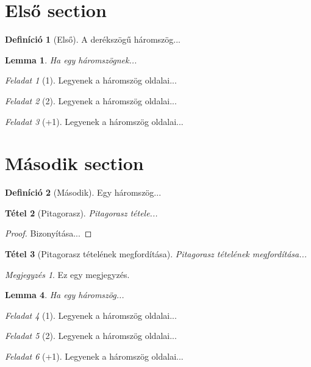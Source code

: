 \documentclass{article}
\newtheorem{tet}{Tétel}
\theoremstyle{definition}
\newtheorem{defin}{Definíció}
\theoremstyle{plain}
\newtheorem{lemma}[tet]{Lemma}
\theoremstyle{remark}
\newtheorem{feladat}{Feladat}[section]
\newtheorem*{megj}{Megjegyzés}
\begin{document}
\section{Első section}
\begin{defin}[Első]
A derékszögű háromszög...
\end{defin}
\begin{lemma}
Ha egy háromszögnek...
\end{lemma}

\begin{feladat}[1]
Legyenek a háromszög oldalai...
\end{feladat}
\begin{feladat}[2]
Legyenek a háromszög oldalai...
\end{feladat}
\begin{feladat}[+1]
Legyenek a háromszög oldalai...
\end{feladat}

\section{Második section}
\begin{defin}[Második]
Egy háromszög...
\end{defin}
\begin{tet}[Pitagorasz]
Pitagorasz tétele...
\end{tet}
\begin{proof}
Bizonyítása...
\end{proof}
\begin{tet}[Pitagorasz tételének megfordítása]
Pitagorasz tételének megfordítása...
\end{tet}
\begin{megj}
Ez egy megjegyzés.
\end{megj}
\begin{lemma}
Ha egy háromszög...
\end{lemma}
\begin{feladat}[1]
Legyenek a háromszög oldalai...
\end{feladat}
\begin{feladat}[2]
Legyenek a háromszög oldalai...
\end{feladat}
\begin{feladat}[+1]
Legyenek a háromszög oldalai...
\end{feladat}
\end{document}

